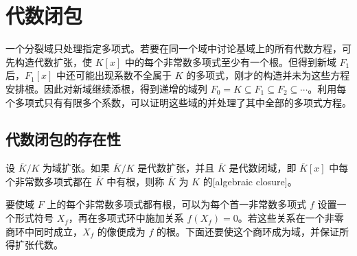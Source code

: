 
\section{代数闭包}
\label{b1:sec:1502}


%
%

一个分裂域只处理指定多项式。若要在同一个域中讨论基域上的所有代数方程，可先构造代数扩张，使 \(K[x]\) 中的每个非常数多项式至少有一个根。但得到新域 \(F_1\) 后，\(F_1[x]\) 中还可能出现系数不全属于 \(K\) 的多项式，刚才的构造并未为这些方程安排根。因此对新域继续添根，得到递增的域列 \(F_0=K\subseteq F_1\subseteq F_2\subseteq\cdots\)。利用每个多项式只有有限多个系数，可以证明这些域的并处理了其中全部的多项式方程。

\subsection{代数闭包的存在性}
\label{b1:subsec:1502:01}

\begin{definition}\label{b1:def:algebraic-closure}
	设 \(\overline K/K\) 为域扩张。如果 \(\overline K/K\) 是代数扩张，并且 \(\overline K\) 是代数闭域，即 \(\overline K[x]\) 中每个非常数多项式都在 \(\overline K\) 中有根，则称 \(\overline K\) 为 \(K\) 的[algebraic closure]。
\end{definition}

要使域 \(F\) 上的每个非常数多项式都有根，可以为每个首一非常数多项式 \(f\) 设置一个形式符号 \(X_f\)，再在多项式环中施加关系 \(f(X_f)=0\)。若这些关系在一个非零商环中同时成立，\(X_f\) 的像便成为 \(f\) 的根。下面还要使这个商环成为域，并保证所得扩张代数。

